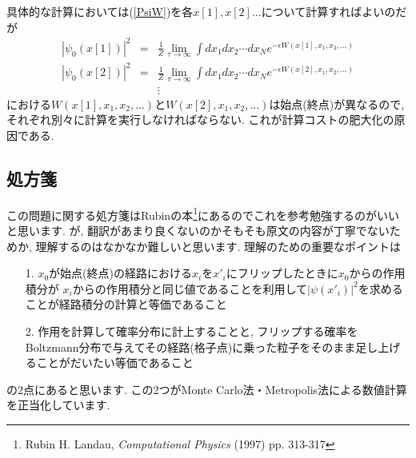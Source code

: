 \documentclass[10.5pt,a4paper]{jreport}
\begin{document}
具体的な計算においては(\ref{PsiW})を各$x[1],x[2] ...$について計算すればよいのだが
\begin{eqnarray}
  |\psi_0(x[1])|^2 &=&\frac{1}{Z}\lim_{\tau\rightarrow\infty}\int dx_1 dx_2\cdots dx_N e^{-\epsilon W(x[1], x_1, x_2, ...)}\\
  |\psi_0(x[2])|^2 &=&\frac{1}{Z}\lim_{\tau\rightarrow\infty}\int dx_1 dx_2\cdots dx_N e^{-\epsilon W(x[2], x_1, x_2, ...)}\\
  \nonumber  &&\vdots
\end{eqnarray}
における$W(x[1], x_1, x_2, ...)$と$W(x[2], x_1, x_2, ...)$は始点(終点)が異なるので, それぞれ別々に計算を実行しなければならない. これが計算コストの肥大化の原因である.
\subsection{処方箋}
この問題に関する処方箋はRubinの本\footnote{Rubin H. Landau, {\it Computational Physics} (1997) pp. 313-317}にあるのでこれを参考勉強するのがいいと思います. が, 翻訳があまり良くないのかそもそも原文の内容が丁寧でないためか, 理解するのはなかなか難しいと思います. 理解のための重要なポイントは
\begin{itemize}
\item[1.] $x_0$が始点(終点)の経路における$x_i$を$x'_i$にフリップしたときに$x_0$からの作用積分が $x_i$からの作用積分と同じ値であることを利用して$|\psi(x'_i)|^2$を求めることが経路積分の計算と等価であること
\item[2.] 作用を計算して確率分布に計上することと, フリップする確率をBoltzmann分布で与えてその経路(格子点)に乗った粒子をそのまま足し上げることがだいたい等価であること
\end{itemize}
の2点にあると思います. この2つがMonte Carlo法・Metropolis法による数値計算を正当化しています.
\end{document}
